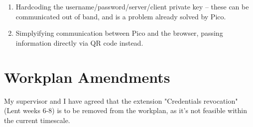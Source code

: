 \documentclass[12pt,a4paper,twoside]{article}
\begin{document}
\begin{enumerate}

\item Hardcoding the username/password/server/client private key -- these can be communicated out of band, and is a problem already solved by Pico.

\item Simplyifying communication between Pico and the browser, passing information directly via QR code instead.

\end{enumerate}

\section*{Workplan Amendments}

My supervisor and I have agreed that the extension "Credentials revocation" (Lent weeks 6-8) is to be removed from the workplan, as it's not feasible within the current timescale.
\end{document}
